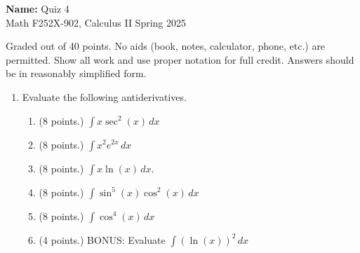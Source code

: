 \documentclass[12pt]{article}
\newcommand{\ds}{\displaystyle}
\newcommand{\points}[1]{(#1 points.)}		%
\begin{document}
\pagestyle{plain}

\noindent \textbf{Name:} \underline{\hspace{15em}}		\hfill	Quiz 4 \\
           Math F252X-902, Calculus II  			\hfill	Spring 2025 	

                \vspace{1cm}
                
Graded out of 40 points. No aids (book, notes,
calculator, phone, etc.) are permitted. Show all work and use proper
notation for full credit. Answers should be in reasonably simplified
form.

\begin{enumerate}

\item Evaluate the following antiderivatives.
  \begin{enumerate}

  \item \points{8} $\ds \int x\sec^2(x) \, dx$
    \vfill

  \item \points{8} $\ds \int x^2 e^{2x} \, dx$
    \vfill

  \item \points{8} $\ds \int x \ln(x) \, dx$.
    \vfill

    \newpage

  \item \points{8} $\ds \int \sin^5(x)\cos^2(x) \, dx$
    \vfill

  \item \points{8} $\ds \int \cos^4(x) \, dx$
    \vfill

  \item \points{4} BONUS: Evaluate $\ds \int (\ln(x))^2 \, dx$
    \vfill
    
  \end{enumerate}

\end{enumerate}
\end{document}
